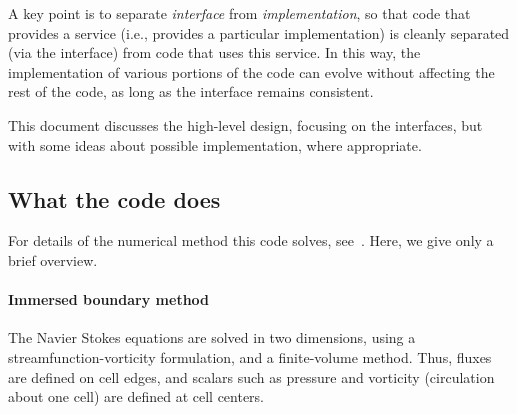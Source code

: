 \documentclass[11pt]{article}
\begin{document}
A key point is to separate {\em interface} from {\em implementation}, so that code that provides a service (i.e., provides a particular implementation) is cleanly separated (via the interface) from code that uses this service.  In this way, the implementation of various portions of the code can evolve without affecting the rest of the code, as long as the interface remains consistent.

This document discusses the high-level design, focusing on the interfaces, but with some ideas about possible implementation, where appropriate.

\subsection{What the code does}
For details of the numerical method this code solves, see~\cite{ColTai-07}.  Here, we give only a brief overview.

\paragraph{Immersed boundary method}
The Navier Stokes equations are solved in two dimensions, using a streamfunction-vorticity formulation, and a finite-volume method.  Thus, fluxes are defined on cell edges, and scalars such as pressure and vorticity (circulation about one cell) are defined at cell centers.
\end{document}
